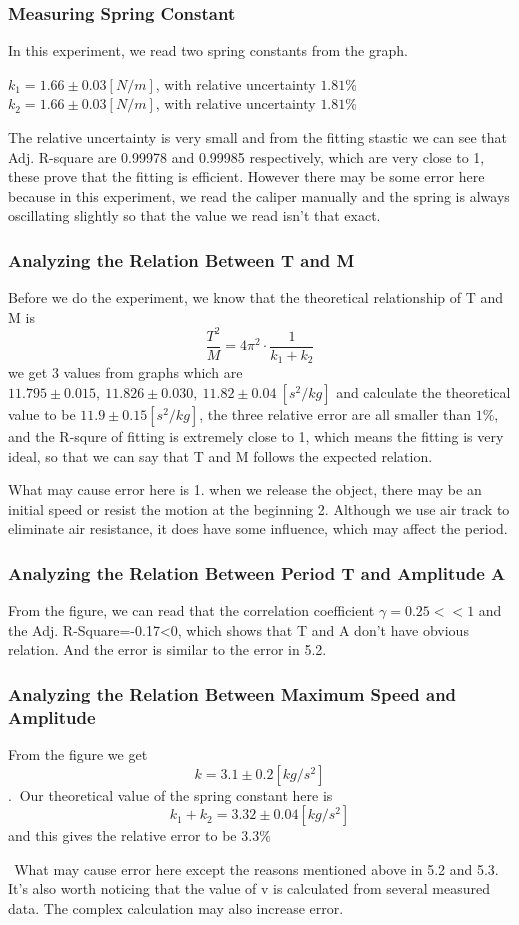 \documentclass[11pt,a4paper]{article}
\begin{document}
\subsubsection{Measuring Spring Constant}
\qquad In this experiment, we read two spring constants from the graph. 

\begin{center}
    $k_1=1.66\pm 0.03[N/m] $, with relative uncertainty $1.81\%$\\
    $k_2=1.66\pm 0.03[N/m] $, with relative uncertainty $1.81\%$
\end{center}
\qquad The relative uncertainty is very small and from the fitting stastic we can see that Adj. R-square are 0.99978 and 0.99985 respectively, which are very close to 1, these prove that the fitting is efficient. However there may be some error here because in this experiment, we read the caliper manually and the spring is always oscillating slightly so that the value we read isn't that exact.
\subsubsection{Analyzing the Relation Between T and M}
\qquad Before we do the experiment, we know that the theoretical relationship of T and M is $$\frac{T^2}{M}=4\pi^2\cdot \frac{1}{k_1+k_2}$$
we get 3 values from graphs which are $11.795\pm 0.015,\  11.826\pm 0.030,\  11.82\pm 0.04 \ [s^2/kg]$ and calculate the theoretical value to be $11.9\pm 0.15[s^2/kg]$, the three relative error are all smaller than $1\%$, and the R-squre of fitting is extremely close to 1, which means the fitting is very ideal, so that we can say that T and M follows the expected relation.\par
\quad What may cause error here is 1. when we release the object, there may be an initial speed or resist the motion at the beginning 2. Although we use air track to eliminate air resistance, it does have some influence, which may affect the period.
\subsubsection{Analyzing the Relation Between Period T and Amplitude A}
\qquad From the figure, we can read that the correlation coefficient $\gamma=0.25<<1$ and the Adj. R-Square=-0.17<0, which shows that T and A don't have obvious relation. And the error is similar to the error in 5.2.
\subsubsection{Analyzing the Relation Between Maximum Speed and Amplitude}
\qquad From the figure we get $$k=3.1\pm 0.2[kg/s^2]$$. \quad $\ $Our theoretical value of the spring constant here is $$k_1+k_2=3.32\pm 0.04[kg/s^2]$$ and this gives the relative error to be $3.3\%$
\par $\ \ $What may cause error here except the reasons mentioned above in 5.2 and 5.3. It's also worth noticing that the value of v is calculated from several measured data. The complex calculation may also increase error.
\end{document}
